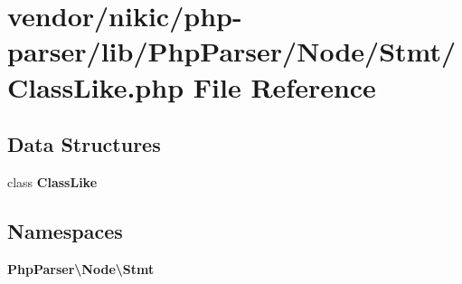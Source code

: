\section{vendor/nikic/php-\/parser/lib/\+Php\+Parser/\+Node/\+Stmt/\+Class\+Like.php File Reference}
\label{_class_like_8php}
\subsection*{Data Structures}
\begin{DoxyCompactItemize}
\item 
class {\bf Class\+Like}
\end{DoxyCompactItemize}
\subsection*{Namespaces}
\begin{DoxyCompactItemize}
\item 
 {\bf Php\+Parser\textbackslash{}\+Node\textbackslash{}\+Stmt}
\end{DoxyCompactItemize}

